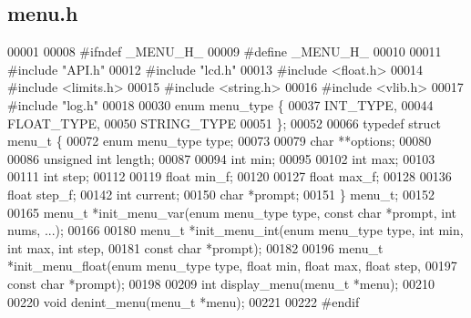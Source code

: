 \subsection{menu.\+h}
\label{a00044_source}

\begin{DoxyCode}
00001 
00008 \textcolor{preprocessor}{#ifndef \_MENU\_H\_}
00009 \textcolor{preprocessor}{#define \_MENU\_H\_}
00010 
00011 \textcolor{preprocessor}{#include "API.h"}
00012 \textcolor{preprocessor}{#include "lcd.h"}
00013 \textcolor{preprocessor}{#include <float.h>}
00014 \textcolor{preprocessor}{#include <limits.h>}
00015 \textcolor{preprocessor}{#include <string.h>}
00016 \textcolor{preprocessor}{#include <vlib.h>}
00017 \textcolor{preprocessor}{#include "log.h"}
00018 
00030 \textcolor{keyword}{enum} menu_type \{
00037   INT_TYPE,
00044   FLOAT_TYPE,
00050   STRING_TYPE
00051 \};
00052 
00066 \textcolor{keyword}{typedef} \textcolor{keyword}{struct }menu_t \{
00072   \textcolor{keyword}{enum} menu_type type;
00073 
00079   \textcolor{keywordtype}{char} **options;
00080 
00086   \textcolor{keywordtype}{unsigned} \textcolor{keywordtype}{int} length;
00087 
00094   \textcolor{keywordtype}{int} min;
00095 
00102   \textcolor{keywordtype}{int} max;
00103 
00111   \textcolor{keywordtype}{int} step;
00112 
00119   \textcolor{keywordtype}{float} min_f;
00120 
00127   \textcolor{keywordtype}{float} max_f;
00128 
00136   \textcolor{keywordtype}{float} step_f;
00142   \textcolor{keywordtype}{int} current;
00150   \textcolor{keywordtype}{char} *prompt;
00151 \} menu_t;
00152 
00165 menu_t *init_menu_var(\textcolor{keyword}{enum} menu_type type, \textcolor{keyword}{const} \textcolor{keywordtype}{char} *prompt, \textcolor{keywordtype}{int} nums, ...);
00166 
00180 menu_t *init_menu_int(\textcolor{keyword}{enum} menu_type type, \textcolor{keywordtype}{int} min, \textcolor{keywordtype}{int} max, \textcolor{keywordtype}{int} step,
00181                       \textcolor{keyword}{const} \textcolor{keywordtype}{char} *prompt);
00182 
00196 menu_t *init_menu_float(\textcolor{keyword}{enum} menu_type type, \textcolor{keywordtype}{float} min, \textcolor{keywordtype}{float} max, \textcolor{keywordtype}{float} step,
00197                         \textcolor{keyword}{const} \textcolor{keywordtype}{char} *prompt);
00198 
00209 \textcolor{keywordtype}{int} display_menu(menu_t *menu);
00210 
00220 \textcolor{keywordtype}{void} denint_menu(menu_t *menu);
00221 
00222 \textcolor{preprocessor}{#endif}
\end{DoxyCode}

